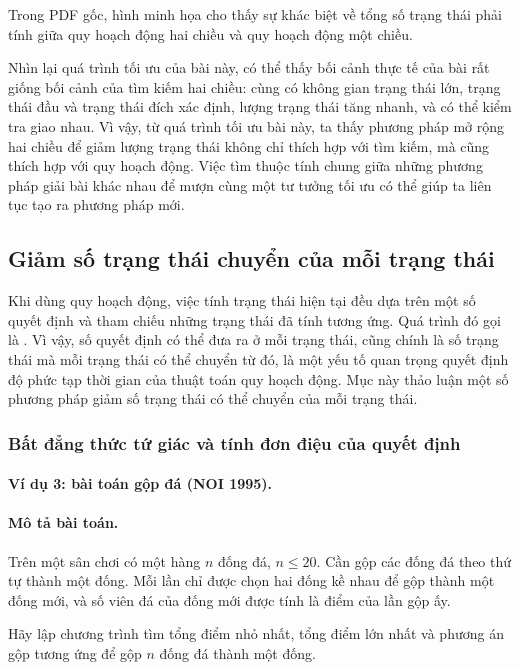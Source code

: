 \documentclass[11pt]{article}
\begin{document}
Trong PDF gốc, hình minh họa cho thấy sự khác biệt về tổng số trạng thái phải
tính giữa quy hoạch động hai chiều và quy hoạch động một chiều.

Nhìn lại quá trình tối ưu của bài này, có thể thấy bối cảnh thực tế của bài
rất giống bối cảnh của tìm kiếm hai chiều: cùng có không gian trạng thái lớn,
trạng thái đầu và trạng thái đích xác định, lượng trạng thái tăng nhanh, và
có thể kiểm tra giao nhau. Vì vậy, từ quá trình tối ưu bài này, ta thấy
phương pháp mở rộng hai chiều để giảm lượng trạng thái không chỉ thích hợp
với tìm kiếm, mà cũng thích hợp với quy hoạch động. Việc tìm thuộc tính chung
giữa những phương pháp giải bài khác nhau để mượn cùng một tư tưởng tối ưu có
thể giúp ta liên tục tạo ra phương pháp mới.

\subsection{Giảm số trạng thái chuyển của mỗi trạng thái}

Khi dùng quy hoạch động, việc tính trạng thái hiện tại đều dựa trên một số
quyết định và tham chiếu những trạng thái đã tính tương ứng. Quá trình đó gọi
là . Vì vậy, số quyết định có thể đưa ra ở mỗi trạng
thái, cũng chính là số trạng thái mà mỗi trạng thái có thể chuyển từ đó, là
một yếu tố quan trọng quyết định độ phức tạp thời gian của thuật toán quy
hoạch động. Mục này thảo luận một số phương pháp giảm số trạng thái có thể
chuyển của mỗi trạng thái.

\subsubsection{Bất đẳng thức tứ giác và tính đơn điệu của quyết định}

\paragraph{Ví dụ 3: bài toán gộp đá (NOI 1995).}

\paragraph{Mô tả bài toán.}
Trên một sân chơi có một hàng \(n\) đống đá, \(n\le20\). Cần gộp các đống đá
theo thứ tự thành một đống. Mỗi lần chỉ được chọn hai đống kề nhau để gộp
thành một đống mới, và số viên đá của đống mới được tính là điểm của lần gộp
ấy.

Hãy lập chương trình tìm tổng điểm nhỏ nhất, tổng điểm lớn nhất và phương án
gộp tương ứng để gộp \(n\) đống đá thành một đống.
\end{document}
